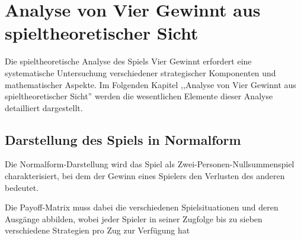 \chapter{Analyse von Vier Gewinnt aus spieltheoretischer Sicht}

%

Die spieltheoretische Analyse des Spiels Vier Gewinnt erfordert eine systematische Untersuchung verschiedener strategischer Komponenten und mathematischer Aspekte. Im Folgenden Kapitel ,,Analyse von Vier Gewinnt aus spieltheoretischer Sicht'' werden die wesentlichen Elemente dieser Analyse detailliert dargestellt.
\section{Darstellung des Spiels in Normalform}
%

Die Normalform-Darstellung wird das Spiel als Zwei-Personen-Nullsummenspiel charakterisiert, bei dem der Gewinn eines Spielers den Verlusten des anderen bedeutet. 


Die Payoff-Matrix muss dabei die verschiedenen Spielsituationen und deren Ausgänge abbilden, wobei jeder Spieler in seiner Zugfolge bis zu sieben verschiedene Strategien pro Zug zur Verfügung hat

